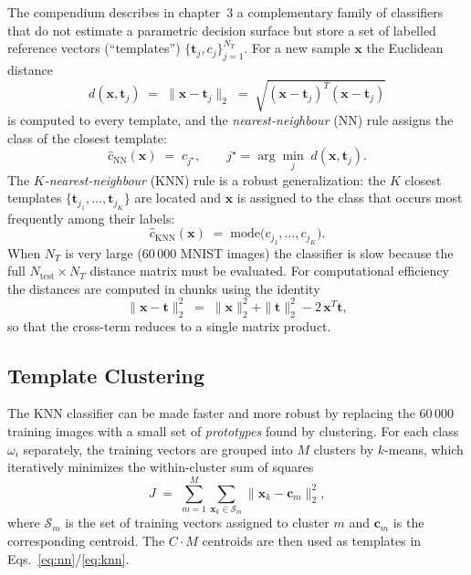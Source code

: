 \documentclass[11pt,a4paper]{article}
\begin{document}
The compendium describes in chapter~3 a complementary family of classifiers that do not estimate a parametric decision surface but store a set of labelled reference vectors (``templates'') $\{\mathbf{t}_j, c_j\}_{j=1}^{N_T}$. For a new sample $\mathbf{x}$ the Euclidean distance
\begin{equation}
    d(\mathbf{x}, \mathbf{t}_j) \;=\; \|\mathbf{x} - \mathbf{t}_j\|_2
    \;=\; \sqrt{(\mathbf{x} - \mathbf{t}_j)^T(\mathbf{x} - \mathbf{t}_j)}
    \label{eq:euclidean}
\end{equation}
is computed to every template, and the \emph{nearest-neighbour} (NN) rule assigns the class of the closest template:
\begin{equation}
    \hat{c}_\text{NN}(\mathbf{x}) \;=\; c_{j^\star}, \qquad
    j^\star = \arg\min_{j}\; d(\mathbf{x}, \mathbf{t}_j).
    \label{eq:nn}
\end{equation}
The \emph{$K$-nearest-neighbour} (KNN) rule is a robust generalization: the $K$ closest templates $\{\mathbf{t}_{j_1},\dots,\mathbf{t}_{j_K}\}$ are located and $\mathbf{x}$ is assigned to the class that occurs most frequently among their labels:
\begin{equation}
    \hat{c}_\text{KNN}(\mathbf{x}) \;=\; \mathrm{mode}\bigl(c_{j_1},\dots,c_{j_K}\bigr).
    \label{eq:knn}
\end{equation}
When $N_T$ is very large (60\,000 MNIST images) the classifier is slow because the full $N_\text{test}\times N_T$ distance matrix must be evaluated. For computational efficiency the distances are computed in chunks using the identity
\begin{equation}
    \|\mathbf{x}-\mathbf{t}\|_2^2 \;=\; \|\mathbf{x}\|_2^2 + \|\mathbf{t}\|_2^2 - 2\,\mathbf{x}^T\mathbf{t},
    \label{eq:dist_trick}
\end{equation}
so that the cross-term reduces to a single matrix product.

\subsection{Template Clustering}
\label{subsec:kmeans}

The KNN classifier can be made faster and more robust by replacing the 60\,000 training images with a small set of \emph{prototypes} found by clustering. For each class $\omega_i$ separately, the training vectors are grouped into $M$ clusters by $k$-means, which iteratively minimizes the within-cluster sum of squares
\begin{equation}
    J \;=\; \sum_{m=1}^{M} \sum_{\mathbf{x}_k \in \mathcal{S}_m} \|\mathbf{x}_k - \mathbf{c}_m\|_2^2,
    \label{eq:kmeans}
\end{equation}
where $\mathcal{S}_m$ is the set of training vectors assigned to cluster $m$ and $\mathbf{c}_m$ is the corresponding centroid. The $C\cdot M$ centroids are then used as templates in Eqs.~\eqref{eq:nn}/\eqref{eq:knn}.
\end{document}
